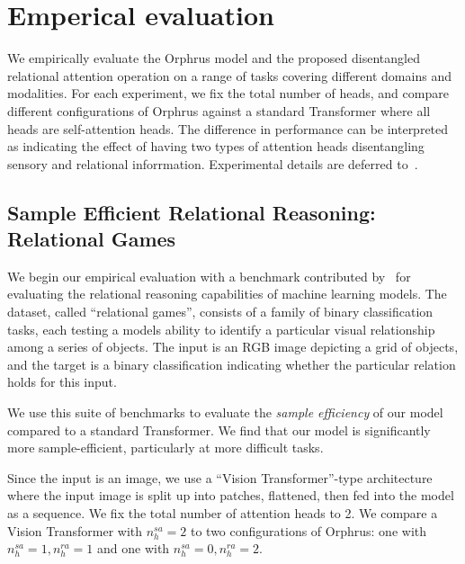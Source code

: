 \section{Emperical evaluation}\label{sec:experiments}

We empirically evaluate the Orphrus model and the proposed disentangled relational attention operation on a range of tasks covering different domains and modalities. For each experiment, we fix the total number of heads, and compare different configurations of Orphrus against a standard Transformer where all heads are self-attention heads. The difference in performance can be interpreted as indicating the effect of having two types of attention heads disentangling sensory and relational inforrmation. Experimental details are deferred to~.

\subsection{Sample Efficient Relational Reasoning: Relational Games}\label{ssec:relgames}

We begin our empirical evaluation with a benchmark contributed by~\citet{shanahanExplicitlyRelationalNeurala} for evaluating the relational reasoning capabilities of machine learning models. The dataset, called ``relational games'', consists of a family of binary classification tasks, each testing a models ability to identify a particular visual relationship among a series of objects. The input is an RGB image depicting a grid of objects, and the target is a binary classification indicating whether the particular relation holds for this input.


We use this suite of benchmarks to evaluate the \textit{sample efficiency} of our model compared to a standard Transformer. We find that our model is significantly more sample-efficient, particularly at more difficult tasks. %

Since the input is an image, we use a ``Vision Transformer''-type architecture~\citep{dosovitskiyImageWorth16x162020} where the input image is split up into patches, flattened, then fed into the model as a sequence. We fix the total number of attention heads to 2. We compare a Vision Transformer with $n_h^{sa} = 2$ to two configurations of Orphrus: one with $n_h^{sa} = 1, n_h^{ra} = 1$ and one with $n_h^{sa} = 0, n_h^{ra} = 2$.

